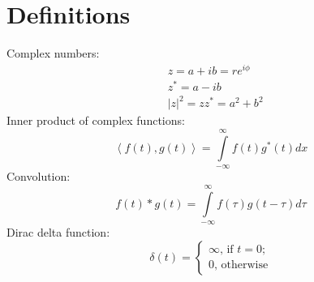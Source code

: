 \documentclass{article}
\begin{document}
\section{Definitions}
Complex numbers:
\begin{align*}
    &z = a + ib = r e^{i\phi} \\
    &z^* = a - ib \\
    &\left| z \right| ^2 = z z^* = a^2 + b^2
\end{align*}
Inner product of complex functions:
\begin{equation*}
    \left< f(t),g(t) \right> = \int \limits^{\infty}_{-\infty} f(t) g^{*}(t) dx
\end{equation*}
Convolution:
\begin{equation*}
f(t) * g(t) =  \int \limits^{\infty}_{-\infty} f(\tau ) g(t - \tau) d \tau
\end{equation*}
Dirac delta function:
\begin{equation*}
    \delta(t) =  \begin{cases}
        \infty, \, \text{if $t = 0$};\\
        0, \, \text{otherwise}
    \end{cases}
\end{equation*}



\end{document}
